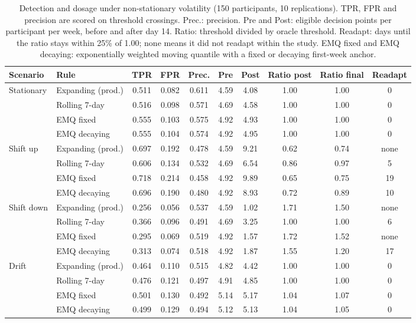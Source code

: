\documentclass[11pt,letterpaper]{article}
\begin{document}
\begin{table}[htbp]
\centering
\scriptsize
\setlength{\tabcolsep}{4pt}
\begin{tabular}{@{}llcccccccc@{}}
\toprule
\textbf{Scenario} & \textbf{Rule} & \textbf{TPR} & \textbf{FPR} & \textbf{Prec.} & \textbf{Pre} & \textbf{Post} & \textbf{Ratio post} & \textbf{Ratio final} & \textbf{Readapt} \\
\midrule
Stationary & Expanding (prod.) & 0.511 & 0.082 & 0.611 & 4.59 & 4.08 & 1.00 & 1.00 & 0 \\
 & Rolling 7-day & 0.516 & 0.098 & 0.571 & 4.69 & 4.58 & 1.00 & 1.00 & 0 \\
 & EMQ fixed & 0.555 & 0.103 & 0.575 & 4.92 & 4.93 & 1.00 & 1.00 & 0 \\
 & EMQ decaying & 0.555 & 0.104 & 0.574 & 4.92 & 4.95 & 1.00 & 1.00 & 0 \\
Shift up & Expanding (prod.) & 0.697 & 0.192 & 0.478 & 4.59 & 9.21 & 0.62 & 0.74 & none \\
 & Rolling 7-day & 0.606 & 0.134 & 0.532 & 4.69 & 6.54 & 0.86 & 0.97 & 5 \\
 & EMQ fixed & 0.718 & 0.214 & 0.458 & 4.92 & 9.89 & 0.65 & 0.75 & 19 \\
 & EMQ decaying & 0.696 & 0.190 & 0.480 & 4.92 & 8.93 & 0.72 & 0.89 & 10 \\
Shift down & Expanding (prod.) & 0.256 & 0.056 & 0.537 & 4.59 & 1.02 & 1.71 & 1.50 & none \\
 & Rolling 7-day & 0.366 & 0.096 & 0.491 & 4.69 & 3.25 & 1.00 & 1.00 & 6 \\
 & EMQ fixed & 0.295 & 0.069 & 0.519 & 4.92 & 1.57 & 1.72 & 1.52 & none \\
 & EMQ decaying & 0.313 & 0.074 & 0.518 & 4.92 & 1.87 & 1.55 & 1.20 & 17 \\
Drift & Expanding (prod.) & 0.464 & 0.110 & 0.515 & 4.82 & 4.42 & 1.00 & 1.00 & 0 \\
 & Rolling 7-day & 0.476 & 0.121 & 0.497 & 4.91 & 4.85 & 1.00 & 1.00 & 0 \\
 & EMQ fixed & 0.501 & 0.130 & 0.492 & 5.14 & 5.17 & 1.04 & 1.07 & 0 \\
 & EMQ decaying & 0.499 & 0.129 & 0.494 & 5.12 & 5.13 & 1.04 & 1.05 & 0 \\
\bottomrule
\end{tabular}
\caption{Detection and dosage under non-stationary volatility (150 participants, 10 replications). TPR, FPR and precision are scored on threshold crossings. Prec.: precision. Pre and Post: eligible decision points per participant per week, before and after day 14. Ratio: threshold divided by oracle threshold. Readapt: days until the ratio stays within 25\% of 1.00; none means it did not readapt within the study. EMQ fixed and EMQ decaying: exponentially weighted moving quantile with a fixed or decaying first-week anchor.}
\label{tab:robustness}
\end{table}
\end{document}
